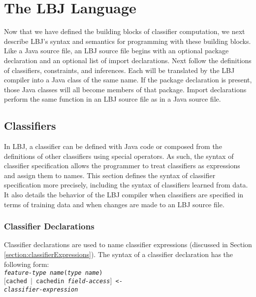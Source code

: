 
\chapter{The LBJ Language} \label{chapter:language}

Now that we have defined the building blocks of classifier computation, we
next describe LBJ's syntax and semantics for programming with these building
blocks. \\

Like a Java source file, an LBJ source file begins with an optional package
declaration and an optional list of import declarations.  Next follow the
definitions of classifiers, constraints, and inferences.  Each will be
translated by the LBJ compiler into a Java class of the same name.  If the
package declaration is present, those Java classes will all become members of
that package.  Import declarations perform the same function in an LBJ source
file as in a Java source file.

\section{Classifiers}

In LBJ, a classifier can be defined with Java code or composed from the
definitions of other classifiers using special operators.  As such, the syntax
of classifier specification allows the programmer to treat classifiers as
expressions and assign them to names.  This section defines the syntax of
classifier specification more precisely, including the syntax of classifiers
learned from data.  It also details the behavior of the LBJ compiler when
classifiers are specified in terms of training data and when changes are made
to an LBJ source file.

\subsection{Classifier Declarations} \label{section:declarations}
Classifier declarations are used to name classifier expressions (discussed in
Section \ref{section:classifierExpressions}).  The syntax of a classifier
declaration has the following form: \\

\vspace{-.25cm}
{\tt \emph{feature-type name}(\emph{type name}) \\
  \mbox{\hspace{1cm}}$[$cached $|$ cachedin \emph{field-access}$]$ <- \\
  \mbox{\hspace{1cm}}\emph{classifier-expression}} \\
\vspace{-.25cm}

